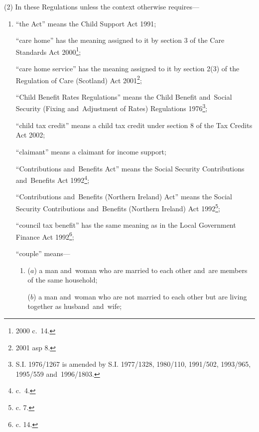 \documentclass[12pt,a4paper]{article}
\begin{document}
(2) In these Regulations unless the context otherwise requires—
\begin{enumerate}\item[]
“the Act” means the Child Support Act 1991;

“care home” has the meaning assigned to it by section 3 of the Care Standards Act 2000\footnote{2000 c.\ 14.};

“care home service” has the meaning assigned to it by section 2(3) of the Regulation of Care (Scotland) Act 2001\footnote{2001 asp 8.};

“Child Benefit Rates Regulations” means the Child Benefit and~Social Security (Fixing and~Adjustment of Rates) Regulations 1976\footnote{\frenchspacing S.I. 1976/1267 is amended by S.I. 1977/1328, 1980/110, 1991/502, 1993/965, 1995/559 and~1996/1803.};

“child tax credit” means a child tax credit under section 8 of the Tax Credits Act 2002;

“claimant” means a claimant for income support;

“Contributions and~Benefits Act” means the Social Security Contributions and~Benefits Act 1992\footnote{ c.~4.};

“Contributions and~Benefits (Northern Ireland) Act” means the Social Security Contributions and~Benefits (Northern Ireland) Act 1992\footnote{ c. 7.};

“council tax benefit” has the same meaning as in the Local Government Finance Act 1992\footnote{ c. 14.};


“couple” means—
\begin{enumerate}\item[]
($a$) 
a man and~woman who are married to each other and~are members of the same household;

($b$) 
a man and~woman who are not married to each other but are living together as husband~and~wife;


\end{enumerate}
\end{enumerate}
\end{document}
